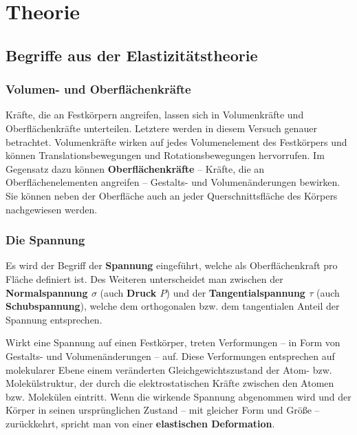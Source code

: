 \section{Theorie}
\label{sec:Theorie}

\subsection{Begriffe aus der Elastizitätstheorie}
\label{sec:begriffe}

\subsubsection{Volumen- und Oberflächenkräfte}
Kräfte, die an Festkörpern angreifen, lassen sich in Volumenkräfte und Oberflächenkräfte 
unterteilen. Letztere werden in diesem Versuch genauer betrachtet. 
Volumenkräfte wirken auf jedes Volumenelement des Festkörpers und können Translationsbewegungen 
und Rotationsbewegungen hervorrufen.
Im Gegensatz dazu können \textbf{Oberflächenkräfte} -- Kräfte, die an Oberflächenelementen
angreifen -- Gestalts- und Volumenänderungen bewirken. Sie können neben der Oberfläche auch an 
jeder Querschnittsfläche des Körpers nachgewiesen werden.

\subsubsection{Die Spannung}
Es wird der Begriff der \textbf{Spannung} eingeführt, welche als Oberflächenkraft pro Fläche
definiert ist. Des Weiteren unterscheidet man zwischen der \textbf{Normalspannung $\sigma$}
(auch \textbf{Druck $P$}) und der \textbf{Tangentialspannung $\tau$} (auch
\textbf{Schubspannung}), welche dem orthogonalen bzw. dem tangentialen Anteil der Spannung
entsprechen. 

Wirkt eine Spannung auf einen Festkörper, treten Verformungen -- in Form von Gestalts- und 
Volumenänderungen -- auf. Diese Verformungen entsprechen auf molekularer Ebene einem veränderten 
Gleichgewichtszustand der Atom- bzw. Molekülstruktur, der durch die elektrostatischen 
Kräfte zwischen den Atomen bzw. Molekülen eintritt. Wenn die wirkende Spannung abgenommen wird
und der Körper in seinen ursprünglichen Zustand -- mit gleicher Form und Größe -- zurückkehrt,
spricht man von einer \textbf{elastischen Deformation}.


